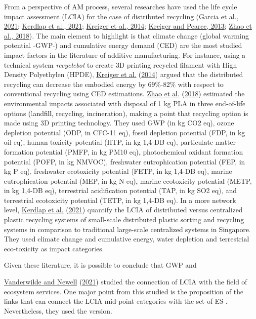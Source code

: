 \documentclass[]{elsarticle} %
\begin{document}
From a perspective of AM process, several researches have used the life cycle impact assessment (LCIA) for the case of distributed recycling (\protect\hyperlink{ref-Garcia2021}{Garcia et al., 2021}; \protect\hyperlink{ref-Kerdlap2021}{Kerdlap et al., 2021}; \protect\hyperlink{ref-Kreiger2014}{Kreiger et al., 2014}; \protect\hyperlink{ref-Kreiger2013}{Kreiger and Pearce, 2013}; \protect\hyperlink{ref-Zhao2018}{Zhao et al., 2018}).
The main element to highlight is that climate change (global warming potential -GWP-) and cumulative energy demand (CED) are the most studied impact factors in the literature of additive manufacturing.
For instance, using a technical system \emph{recyclebot} to create 3D printing recycled filament with High Density Polyethylen (HPDE),
\protect\hyperlink{ref-Kreiger2014}{Kreiger et al.} (\protect\hyperlink{ref-Kreiger2014}{2014}) argued that the distributed recycling can decrease the embodied energy by 69\%-82\% with respect to conventional recycling using CED estimations.
\protect\hyperlink{ref-Zhao2018}{Zhao et al.} (\protect\hyperlink{ref-Zhao2018}{2018}) estimated the environmental impacts associated with disposal of 1 kg PLA in three end-of-life options (landfill, recycling, incineration), making a point that recycling option is made using 3D printing technology.
They used GWP (in kg CO2 eq), ozone depletion potential (ODP, in CFC-11 eq), fossil depletion potential (FDP, in kg oil eq), human toxicity potential (HTP, in kg 1,4-DB eq), particulate matter formation potential (PMFP, in kg PM10 eq), photochemical oxidant formation potential (POFP, in kg NMVOC), freshwater eutrophication potential (FEP, in kg P eq), freshwater ecotoxicity potential (FETP, in kg 1,4-DB eq), marine eutrophication potential (MEP, in kg N eq), marine ecotoxicity potential (METP, in kg 1,4-DB eq), terrestrial acidification potential (TAP, in kg SO2 eq), and terrestrial ecotoxicity potential (TETP, in kg 1,4-DB eq).
In a more network level, \protect\hyperlink{ref-Kerdlap2021}{Kerdlap et al.} (\protect\hyperlink{ref-Kerdlap2021}{2021}) quantify the LCIA of distributed versus centralized plastic recycling systems of small-scale distributed plastic sorting and recycling systems in comparison to traditional large-scale centralized systems in Singapore. They used climate change and cumulative energy, water depletion and terrestrial eco-toxicity as impact categories.

Given these literature, it is possible to conclude that GWP and

\protect\hyperlink{ref-Vanderwilde2021}{Vanderwilde and Newell} (\protect\hyperlink{ref-Vanderwilde2021}{2021}) studied the connection of LCIA with the field of ecosystem services.
One major point from this studied is the proposition of the links that can connect the LCIA mid-point categories with the set of ES .
Nevertheless, they used the version.
\end{document}
